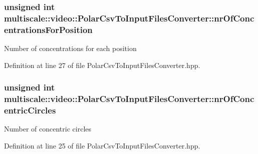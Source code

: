 \hypertarget{classmultiscale_1_1video_1_1PolarCsvToInputFilesConverter_a3a9301788514c50c295ca113a4114938}{
\subsubsection[{nr\-Of\-Concentrations\-For\-Position}]{\setlength{\rightskip}{0pt plus 5cm}unsigned int {\bf multiscale\-::video\-::\-Polar\-Csv\-To\-Input\-Files\-Converter\-::nr\-Of\-Concentrations\-For\-Position}}}\label{classmultiscale_1_1video_1_1PolarCsvToInputFilesConverter_a3a9301788514c50c295ca113a4114938}
\-Number of concentrations for each position 

\-Definition at line 27 of file \-Polar\-Csv\-To\-Input\-Files\-Converter.\-hpp.

\hypertarget{classmultiscale_1_1video_1_1PolarCsvToInputFilesConverter_a7aa37d18880e822369cbe118a093e24f}{
\subsubsection[{nr\-Of\-Concentric\-Circles}]{\setlength{\rightskip}{0pt plus 5cm}unsigned int {\bf multiscale\-::video\-::\-Polar\-Csv\-To\-Input\-Files\-Converter\-::nr\-Of\-Concentric\-Circles}}}\label{classmultiscale_1_1video_1_1PolarCsvToInputFilesConverter_a7aa37d18880e822369cbe118a093e24f}
\-Number of concentric circles 

\-Definition at line 25 of file \-Polar\-Csv\-To\-Input\-Files\-Converter.\-hpp.

